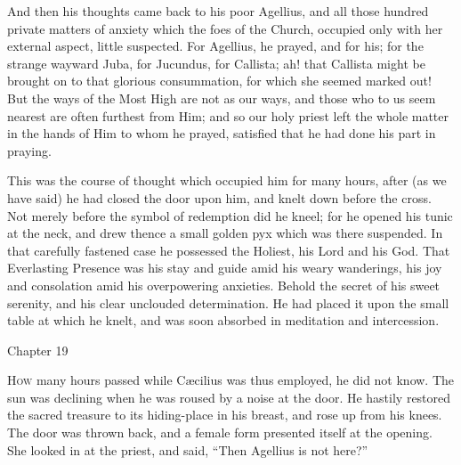 And then his thoughts came back to his poor Agellius, and all those
hundred private matters of anxiety which the foes of the Church,
occupied only with her external aspect, little suspected. For Agellius,
he prayed, and for his; for the strange wayward Juba, for Jucundus,
for Callista; ah! that Callista might be brought on to that glorious
consummation, for which she seemed marked out! But the ways of the
Most High are not as our ways, and those who to us seem nearest are
often furthest from Him; and so our holy priest left the whole matter
in the hands of Him to whom he prayed, satisfied that he had done his
part in praying.

This was the course of thought which occupied him for many hours,
after (as we have said) he had closed the door upon him, and knelt
down before the cross. Not merely before the symbol of redemption did
he kneel; for he opened his tunic at the neck, and drew thence a small
golden pyx which was there suspended. In that carefully fastened case
he possessed the Holiest, his Lord and his God. That Everlasting
Presence was his stay and guide amid his weary wanderings, his joy and
consolation amid his overpowering anxieties. Behold the secret of his
sweet serenity, and his clear unclouded determination. He had placed
it upon the small table at which he knelt, and was soon absorbed in
meditation and intercession.

Chapter 19


H\textsc{ow} many hours passed while Cæcilius was thus employed, he
did not know. The sun was declining when he was roused by a noise at
the door. He hastily restored the sacred treasure to its hiding-place
in his breast, and rose up from his knees. The door was thrown back,
and a female form presented itself at the opening. She looked in at
the priest, and said, ``Then Agellius is not here?''

